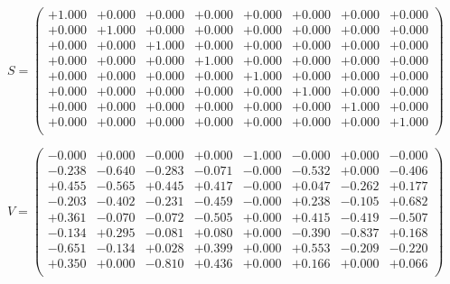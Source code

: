 \documentclass[9pt]{article}
\theoremstyle{plain}
\theoremstyle{definition}
\theoremstyle{remark}
\numberwithin{equation}{section}
\begin{document}
$S = \left(
\begin{array}{
cccccccc}
+1.000 & +0.000 & +0.000 & +0.000 & +0.000 & +0.000 & +0.000 & +0.000 \\
+0.000 & +1.000 & +0.000 & +0.000 & +0.000 & +0.000 & +0.000 & +0.000 \\
+0.000 & +0.000 & +1.000 & +0.000 & +0.000 & +0.000 & +0.000 & +0.000 \\
+0.000 & +0.000 & +0.000 & +1.000 & +0.000 & +0.000 & +0.000 & +0.000 \\
+0.000 & +0.000 & +0.000 & +0.000 & +1.000 & +0.000 & +0.000 & +0.000 \\
+0.000 & +0.000 & +0.000 & +0.000 & +0.000 & +1.000 & +0.000 & +0.000 \\
+0.000 & +0.000 & +0.000 & +0.000 & +0.000 & +0.000 & +1.000 & +0.000 \\
+0.000 & +0.000 & +0.000 & +0.000 & +0.000 & +0.000 & +0.000 & +1.000 \\
\end{array}
\right)$ \newline 

$V = \left(
\begin{array}{
cccccccc}
-0.000 & +0.000 & -0.000 & +0.000 & -1.000 & -0.000 & +0.000 & -0.000 \\
-0.238 & -0.640 & -0.283 & -0.071 & -0.000 & -0.532 & +0.000 & -0.406 \\
+0.455 & -0.565 & +0.445 & +0.417 & -0.000 & +0.047 & -0.262 & +0.177 \\
-0.203 & -0.402 & -0.231 & -0.459 & -0.000 & +0.238 & -0.105 & +0.682 \\
+0.361 & -0.070 & -0.072 & -0.505 & +0.000 & +0.415 & -0.419 & -0.507 \\
-0.134 & +0.295 & -0.081 & +0.080 & +0.000 & -0.390 & -0.837 & +0.168 \\
-0.651 & -0.134 & +0.028 & +0.399 & +0.000 & +0.553 & -0.209 & -0.220 \\
+0.350 & +0.000 & -0.810 & +0.436 & +0.000 & +0.166 & +0.000 & +0.066 \\
\end{array}
\right)$ \newline 
\end{document}

